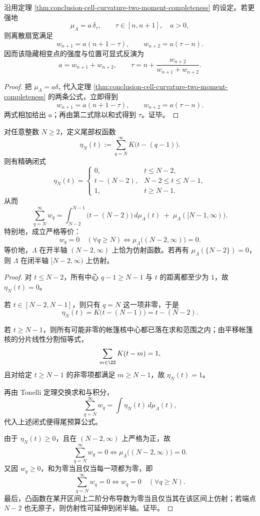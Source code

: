 \begin{theorem}[单隐藏相变点的精确反演]\label{thm:conclusion-single-hidden-phase-transition-exact-inversion}
沿用定理 \ref{thm:conclusion-cell-curvature-two-moment-completeness} 的设定。若更强地
\[
\mu_\Lambda=a\,\delta_\tau,
\qquad
\tau\in[n,n+1],\quad a>0,
\]
则离散扇宽满足
\[
w_{n+1}=a(n+1-\tau),
\qquad
w_{n+2}=a(\tau-n).
\]
因而该隐藏相变点的强度与位置可显式反演为
\[
a=w_{n+1}+w_{n+2},
\qquad
\tau=n+\frac{w_{n+2}}{w_{n+1}+w_{n+2}}.
\]
\end{theorem}
\begin{proof}
把 \(\mu_\Lambda=a\delta_\tau\) 代入定理 \ref{thm:conclusion-cell-curvature-two-moment-completeness} 的两条公式，立即得到
\[
w_{n+1}=a(n+1-\tau),
\qquad
w_{n+2}=a(\tau-n).
\]
两式相加给出 \(a\)；再由第二式除以和式得到 \(\tau\)。证毕。
\end{proof}

\begin{theorem}[尾曲率预算与连续冻结的等价]\label{thm:conclusion-tail-curvature-budget-equivalent-continuous-freezing}
对任意整数 \(N\ge 2\)，定义尾部权函数
\[
\eta_N(t):=\sum_{q=N}^{\infty}K\bigl(t-(q-1)\bigr).
\]
则有精确闭式
\[
\eta_N(t)=
\begin{cases}
0, & t\le N-2,\\[2mm]
t-(N-2), & N-2\le t\le N-1,\\[2mm]
1, & t\ge N-1.
\end{cases}
\]
从而
\[
\sum_{q=N}^{\infty}w_q
=
\int_{N-2}^{N-1}\bigl(t-(N-2)\bigr)\,d\mu_\Lambda(t)
\;+\;
\mu_\Lambda([N-1,\infty)).
\]
特别地，成立严格等价：
\[
w_q=0\quad(\forall q\ge N)
\iff
\mu_\Lambda\bigl((N-2,\infty)\bigr)=0.
\]
等价地，\(\Lambda\) 在开半轴 \((N-2,\infty)\) 上恰为仿射函数。若再有 \(\mu_\Lambda(\{N-2\})=0\)，则 \(\Lambda\) 在闭半轴 \([N-2,\infty)\) 上仿射。
\end{theorem}
\begin{proof}
对 \(t\le N-2\)，所有中心 \(q-1\ge N-1\) 与 \(t\) 的距离都至少为 \(1\)，故 \(\eta_N(t)=0\)。

若 \(t\in[N-2,N-1]\)，则只有 \(q=N\) 这一项非零，于是
\[
\eta_N(t)=K\bigl(t-(N-1)\bigr)=t-(N-2).
\]

若 \(t\ge N-1\)，则所有可能非零的帐篷核中心都已落在求和范围之内；由平移帐篷核的分片线性分割恒等式，
\[
\sum_{m\in\ZZ}K(t-m)=1,
\]
且对给定 \(t\ge N-1\) 的非零项都满足 \(m\ge N-1\)，故 \(\eta_N(t)=1\)。

再由 Tonelli 定理交换求和与积分，
\[
\sum_{q=N}^{\infty}w_q
=
\int \eta_N(t)\,d\mu_\Lambda(t),
\]
代入上述闭式便得尾预算公式。

由于 \(\eta_N(t)\ge 0\)，且在 \((N-2,\infty)\) 上严格为正，故
\[
\sum_{q=N}^{\infty}w_q=0
\iff
\mu_\Lambda\bigl((N-2,\infty)\bigr)=0.
\]
又因 \(w_q\ge 0\)，和为零当且仅当每一项都为零，即
\[
\sum_{q=N}^{\infty}w_q=0
\iff
w_q=0\quad(\forall q\ge N).
\]
最后，凸函数在某开区间上二阶分布导数为零当且仅当其在该区间上仿射；若端点 \(N-2\) 也无原子，则仿射性可延伸到闭半轴。证毕。
\end{proof}

